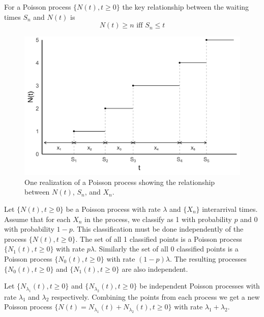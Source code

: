 \begin{remark}
For a Poisson process $\{N(t), t \geq 0\}$ the key relationship between the waiting times $S_n$ and $N(t)$ is
$$
N(t) \geq n \text{ iff } S_n \leq t
$$
\end{remark}

\begin{figure}[H]
  \centering
    \includegraphics[width=.9\textwidth]{figures/poisson_realization.png}
   \caption{One realization of a Poisson process showing the relationship between $N(t)$, $S_n$, and $X_n$.}
  \label{fig:poisson_realization}
\end{figure}

\begin{theorem} \label{thm:poisson_thinning}
Let $\{N(t), t \geq 0\}$ be a Poisson process with rate $\lambda$ and $\{X_n\}$ interarrival times.
Assume that for each $X_n$ in the process, we classify as 1 with probability $p$ and 0 with probability $1 - p$.
This classification must be done independently of the process $\{N(t), t \geq 0\}$.
The set of all 1 classified points is a Poisson process $\{N_1(t), t \geq 0\}$ with rate $p \lambda$.
Similarly the set of all 0 classified points is a Poisson process $\{N_0(t), t \geq 0\}$ with rate $(1 - p) \lambda$.
The resulting processes
$\{N_0(t), t \geq 0\}$ and $\{N_1(t), t \geq 0\}$ are also independent.
\end{theorem}

\begin{theorem} \label{thm:poisson_super}
Let $\{N_{\lambda_1}(t), t \geq 0\}$ and $\{N_{\lambda_2}(t), t \geq 0\}$ be independent Poisson processes with rate $\lambda_1$ and $\lambda_2$ respectively.
Combining the points from each process we get a new Poisson process $\{N(t) = N_{\lambda_1}(t) + N_{\lambda_2}(t), t \geq 0\}$ with rate $\lambda_1 + \lambda_2$.
\end{theorem}


